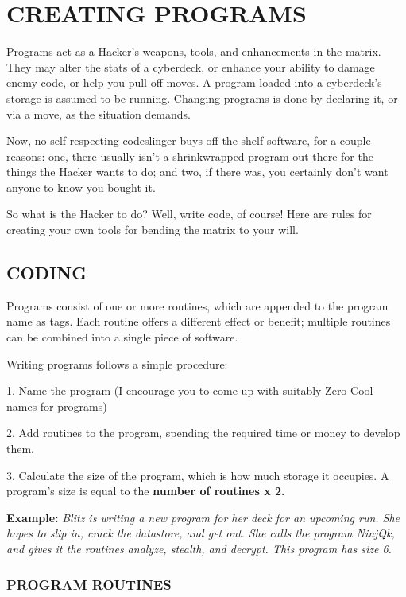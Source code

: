 \documentclass[oneside,10pt]{article}
\begin{document}
\section{CREATING PROGRAMS}
\begin{multicols}{2}
Programs act as a Hacker’s weapons, tools, and enhancements in the matrix. They may alter the stats of a cyberdeck,
or enhance your ability to damage enemy code, or help you
pull off moves. A program loaded into a cyberdeck’s storage
is assumed to be running. Changing programs is done by declaring it, or via a move, as the situation demands.

Now, no self-respecting codeslinger buys off-the-shelf software, for a couple reasons: one, there usually isn’t a shrinkwrapped program out there for the things the Hacker wants
to do; and two, if there was, you certainly don’t want anyone
to know you bought it.

So what is the Hacker to do? Well, write code, of course!
Here are rules for creating your own tools for bending the
matrix to your will.

\subsection{CODING}
Programs consist of one or more routines, which are appended to the program name as tags. Each routine offers a different effect or benefit; multiple routines can be combined into
a single piece of software.

Writing programs follows a simple procedure:
\begin{dent}

1.	Name the program (I encourage you to come up with
suitably Zero Cool names for programs)

2.	Add routines to the program, spending the required
time or money to develop them.

3.	Calculate the size of the program, which is how much
storage it occupies. A program’s size is equal to the
\textbf{number of routines x 2.}

\textbf{Example:} \textit{Blitz is writing a new program for her deck for
an upcoming run. She hopes to slip in, crack the datastore,
and get out. She calls the program NinjQk, and gives it
the routines analyze, stealth, and decrypt. This program
has size 6.}
\end{dent}
\subsubsection{PROGRAM ROUTINES}


\end{multicols}
\end{document}
